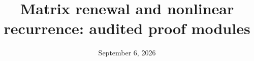 \documentclass[11pt]{article}
\begin{document}
\title{Matrix renewal and nonlinear recurrence: audited proof modules}
\author{}
\date{September 6, 2026}
\maketitle

\appendix




\end{document}
